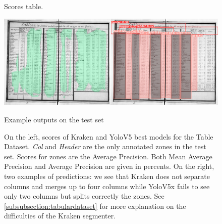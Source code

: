\documentclass{jdmdh}
\begin{document}
\begin{figure}
\begin{minipage}{.5\linewidth}
\centering
{}
\caption{Scores table.}
\label{tab:scores:table}
\end{minipage}%
\begin{minipage}{.5\linewidth}
\includegraphics[width=\linewidth]{images/tableexemple.jpg}
\caption{Example outputs on the test set}
\label{fig:output:table}
\corrauthor{}{}
\end{minipage}%
\caption{On the left, scores of Kraken and YoloV5 best models for the Table Dataset. \textit{Col} and \textit{Header} are the only annotated zones in the test set. Scores for zones are the Average Precision. Both Mean Average Precision and Average Precision are given in percents. On the right, two examples of predictions: we see that Kraken does not separate columns and merges up to four columns while YoloV5x fails to see only two columns but splits correctly the zones. See \ref{subsubsection:tabulardataset} for more explanation on the difficulties of the Kraken segmenter.}
\end{figure}
\end{document}
